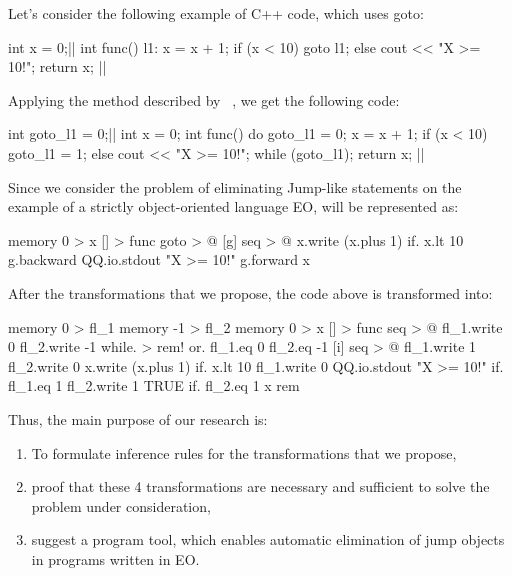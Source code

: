 Let's consider the following example of C++ code, which uses goto:
\begin{ffcode}
int x = 0;|$\label{ln:cpp0}$|
int func() {
l1:
  x = x + 1;
  if (x < 10)
    goto l1;
  else
    cout << "X >= 10!\n";
  return x;
}|$\label{ln:cpp1}$|
\end{ffcode}
Applying the method described by ~\citet{erosa1994taming}, we get the following code:
\begin{ffcode}
int goto_l1 = 0;|$\label{ln:tcpp0}$|
int x = 0;
int func() {
  do {
    goto_l1 = 0;
    x = x + 1;
    if (x < 10)
      goto_l1 = 1;
    else
      cout << "X >= 10!\n";
  } while (goto_l1);
  return x;
}|$\label{ln:tcpp1}$|
\end{ffcode}

Since we consider the problem of eliminating Jump-like statements on the example of a strictly object-oriented language EO,  will be represented as:
\begin{ffcode}
memory 0 > x
[] > func
  goto > @
    [g]
      seq > @
        x.write (x.plus 1)
        if.
          x.lt 10
          g.backward
          QQ.io.stdout "X >= 10!\n"
        g.forward x
\end{ffcode}
After the transformations that we propose, the code above is transformed into:
\begin{ffcode}
memory 0 > fl_1
memory -1 > fl_2
memory 0 > x
[] > func
  seq > @
    fl_1.write 0
    fl_2.write -1
    while. > rem!
      or.
        fl_1.eq 0
        fl_2.eq -1
      [i]
        seq > @
          fl_1.write 1
          fl_2.write 0
          x.write (x.plus 1)
          if.
            x.lt 10
            fl_1.write 0
            QQ.io.stdout "X >= 10!\n"
          if.
            fl_1.eq 1
            fl_2.write 1
            TRUE
    if.
      fl_2.eq 1
      x
      rem
\end{ffcode}

Thus, the main purpose of our research is:
\begin{enumerate}
    \item To formulate inference rules for the transformations that we propose,
    \item proof that these 4 transformations are necessary and sufficient to solve the problem under consideration,
    \item suggest a program tool, which
    enables automatic elimination of jump objects in programs written in EO.
\end{enumerate}

